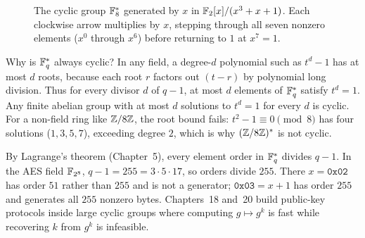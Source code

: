 \begin{figure}[htbp]
\centering
{}
\caption{The cyclic group $\mathbb{F}_8^{*}$ generated by $x$ in $\mathbb{F}_2[x]/(x^3+x+1)$. Each clockwise arrow multiplies by $x$, stepping through all seven nonzero elements ($x^0$ through $x^6$) before returning to $1$ at $x^7 = 1$.}
\label{ch06:fig-cycle8}
\end{figure}

\begin{whybox}
Why is $\mathbb{F}_q^{*}$ always cyclic? In any field, a degree-$d$ polynomial such as
$t^d - 1$ has at most $d$ roots, because each root $r$ factors out $(t - r)$ by
polynomial long division. Thus for every divisor $d$ of $q-1$, at most $d$
elements of $\mathbb{F}_q^{*}$ satisfy $t^d = 1$. Any finite abelian group with at most
$d$ solutions to $t^d = 1$ for every $d$ is cyclic. For a non-field ring like
$\mathbb{Z}/8\mathbb{Z}$, the root bound fails: $t^2 - 1 \equiv 0 \pmod 8$ has four solutions
($1, 3, 5, 7$), exceeding degree $2$, which is why $(\mathbb{Z}/8\mathbb{Z})^{*}$ is not cyclic.
\end{whybox}

\begin{connectionbox}
By Lagrange's theorem (Chapter~5), every element order in $\mathbb{F}_q^{*}$ divides
$q-1$. In the AES field $\mathbb{F}_{2^8}$, $q-1 = 255 = 3 \cdot 5 \cdot 17$, so orders
divide $255$. There $x = \texttt{0x02}$ has order $51$ rather than $255$ and is
not a generator; $\texttt{0x03} = x+1$ has order $255$ and generates all $255$
nonzero bytes. Chapters~18 and~20 build public-key protocols inside large
cyclic groups where computing $g \mapsto g^k$ is fast while recovering $k$ from
$g^k$ is infeasible.
\end{connectionbox}

